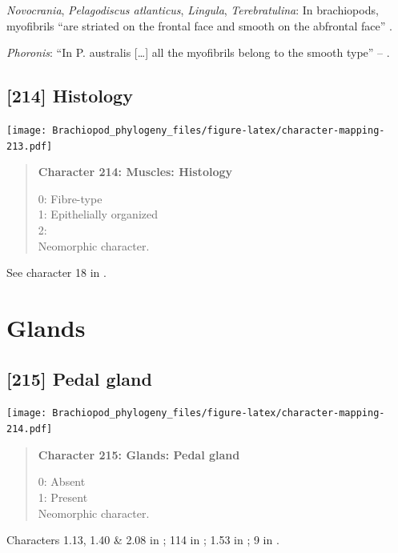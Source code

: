 \documentclass[openany]{book}
\begin{document}
\hypertarget{Lingula-coding-213}{}
\emph{Novocrania}, \emph{Pelagodiscus atlanticus}, \emph{Lingula},
\emph{Terebratulina}: In brachiopods, myofibrils ``are striated on the
frontal face and smooth on the abfrontal face'' \citep{Pardos1991}.

\hypertarget{Phoronis-coding-213}{}
\emph{Phoronis}: ``In P. australis {[}\ldots{}{]} all the myofibrils
belong to the smooth type'' -- \citet{Pardos1991}.

\subsection*{{[}214{]} Histology}\label{histology}

\texttt{[image: Brachiopod\_phylogeny\_files/figure-latex/character-mapping-213.pdf]}

\begin{quote}
\textbf{Character 214: Muscles: Histology}

0: Fibre-type\\
1: Epithelially organized\\
2:\\
Neomorphic character.
\end{quote}

See character 18 in \citet{Haszprunar1996}.

\section{Glands}\label{glands-1}

\subsection*{{[}215{]} Pedal gland}\label{pedal-gland-1}

\texttt{[image: Brachiopod\_phylogeny\_files/figure-latex/character-mapping-214.pdf]}

\begin{quote}
\textbf{Character 215: Glands: Pedal gland}

0: Absent\\
1: Present\\
Neomorphic character.
\end{quote}

Characters 1.13, 1.40 \& 2.08 in \citet{Scheltema1993}; 114 in
\citet{Giribet2002}; 1.53 in \citet{SPS1996}; 9 in
\citet{Haszprunar1996}.
\end{document}
